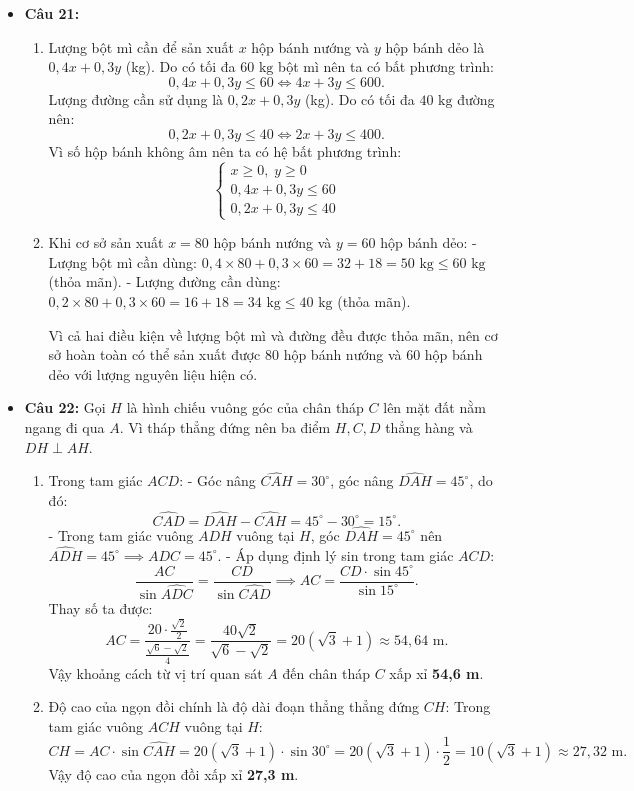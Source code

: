 \documentclass[12pt,a4paper]{article}
\begin{document}
\begin{itemize}[leftmargin=0.6cm, itemsep=4pt, topsep=1pt]
\item \textbf{Câu 21:}
\begin{enumerate}[label=\alph*), itemsep=2pt, topsep=1pt]
    \item Lượng bột mì cần để sản xuất $x$ hộp bánh nướng và $y$ hộp bánh dẻo là $0{,}4x + 0{,}3y$ (kg). Do có tối đa $60\text{ kg}$ bột mì nên ta có bất phương trình:
    \[
    0{,}4x + 0{,}3y \le 60 \iff 4x + 3y \le 600.
    \]
    Lượng đường cần sử dụng là $0{,}2x + 0{,}3y$ (kg). Do có tối đa $40\text{ kg}$ đường nên:
    \[
    0{,}2x + 0{,}3y \le 40 \iff 2x + 3y \le 400.
    \]
    Vì số hộp bánh không âm nên ta có hệ bất phương trình:
    \[
    \begin{cases} x \ge 0,\; y \ge 0 \\ 0{,}4x + 0{,}3y \le 60 \\ 0{,}2x + 0{,}3y \le 40 \end{cases}
    \]
    \item Khi cơ sở sản xuất $x = 80$ hộp bánh nướng và $y = 60$ hộp bánh dẻo:
    - Lượng bột mì cần dùng: $0{,}4 \times 80 + 0{,}3 \times 60 = 32 + 18 = 50\text{ kg} \le 60\text{ kg}$ (thỏa mãn).
    - Lượng đường cần dùng: $0{,}2 \times 80 + 0{,}3 \times 60 = 16 + 18 = 34\text{ kg} \le 40\text{ kg}$ (thỏa mãn).
    
    Vì cả hai điều kiện về lượng bột mì và đường đều được thỏa mãn, nên cơ sở hoàn toàn có thể sản xuất được $80$ hộp bánh nướng và $60$ hộp bánh dẻo với lượng nguyên liệu hiện có.
\end{enumerate}

\enlargethispage{2\baselineskip}
\item \textbf{Câu 22:} Gọi $H$ là hình chiếu vuông góc của chân tháp $C$ lên mặt đất nằm ngang đi qua $A$. Vì tháp thẳng đứng nên ba điểm $H, C, D$ thẳng hàng và $DH \perp AH$.
\begin{enumerate}[label=\alph*), itemsep=2pt, topsep=1pt]
    \item Trong tam giác $ACD$:
    - Góc nâng $\widehat{CAH} = 30^\circ$, góc nâng $\widehat{DAH} = 45^\circ$, do đó:
    \[
    \widehat{CAD} = \widehat{DAH} - \widehat{CAH} = 45^\circ - 30^\circ = 15^\circ.
    \]
    - Trong tam giác vuông $ADH$ vuông tại $H$, góc $\widehat{DAH} = 45^\circ$ nên $\widehat{ADH} = 45^\circ \implies \widehat{ADC} = 45^\circ$.
    - Áp dụng định lý sin trong tam giác $ACD$:
    \[
    \dfrac{AC}{\sin \widehat{ADC}} = \dfrac{CD}{\sin \widehat{CAD}} \implies AC = \dfrac{CD \cdot \sin 45^\circ}{\sin 15^\circ}.
    \]
    Thay số ta được:
    \[
    AC = \dfrac{20 \cdot \frac{\sqrt{2}}{2}}{\frac{\sqrt{6} - \sqrt{2}}{4}} = \dfrac{40\sqrt{2}}{\sqrt{6} - \sqrt{2}} = 20(\sqrt{3} + 1) \approx 54{,}64\text{ m}.
    \]
    Vậy khoảng cách từ vị trí quan sát $A$ đến chân tháp $C$ xấp xỉ \textbf{54,6 m}.
    \item Độ cao của ngọn đồi chính là độ dài đoạn thẳng thẳng đứng $CH$:
    Trong tam giác vuông $ACH$ vuông tại $H$:
    \[
    CH = AC \cdot \sin \widehat{CAH} = 20(\sqrt{3} + 1) \cdot \sin 30^\circ = 20(\sqrt{3} + 1) \cdot \dfrac{1}{2} = 10(\sqrt{3} + 1) \approx 27{,}32\text{ m}.
    \]
    Vậy độ cao của ngọn đồi xấp xỉ \textbf{27,3 m}.
\end{enumerate}
\end{itemize}
\end{document}
